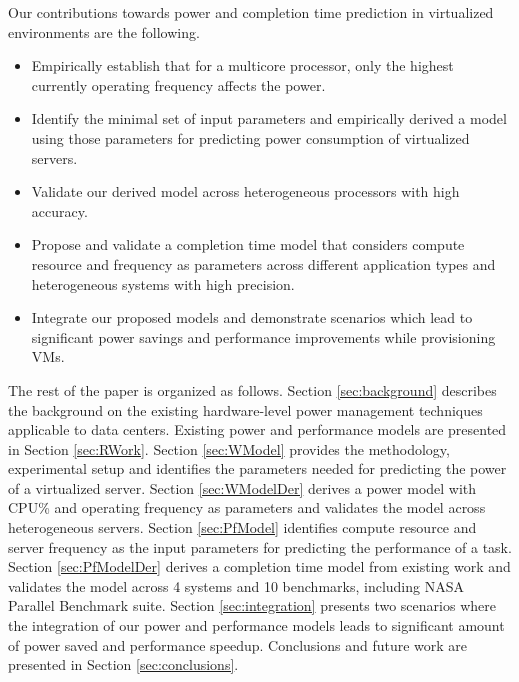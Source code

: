 \documentclass{sig-alternate}
\begin{document}
Our contributions towards power and completion time prediction in virtualized environments are the following.
\begin{itemize}
 \item Empirically establish that for a multicore processor, only the highest currently operating frequency affects the power. 
 \item Identify the minimal set of input parameters and empirically derived a model using those parameters for predicting power consumption of virtualized servers.
 \item Validate our derived model across heterogeneous processors with high accuracy.
 \item Propose and validate a completion time model that considers compute resource and frequency as parameters across different application types and heterogeneous systems with high precision. 
 \item Integrate our proposed models and demonstrate scenarios which lead to significant power savings and performance improvements while provisioning VMs.
\end{itemize}



The rest of the paper is organized as follows. Section \ref{sec:background} describes the background on the existing hardware-level power management techniques applicable to data centers. Existing power and performance models are presented in Section \ref{sec:RWork}. Section \ref{sec:WModel} provides the methodology, experimental setup and identifies the parameters needed for predicting the power of a virtualized server. Section \ref{sec:WModelDer} derives a power model with CPU\% and operating frequency as parameters and validates the model across heterogeneous servers. Section \ref{sec:PfModel} identifies compute resource and server frequency as the input parameters for predicting the performance of a task. Section \ref{sec:PfModelDer} derives a completion time model from existing work and validates the model across 4 systems and 10 benchmarks, including NASA Parallel Benchmark suite. Section \ref{sec:integration} presents two scenarios where the integration of our power and performance models leads to significant amount of power saved and performance speedup. Conclusions and future work are presented in Section \ref{sec:conclusions}.
\end{document}
